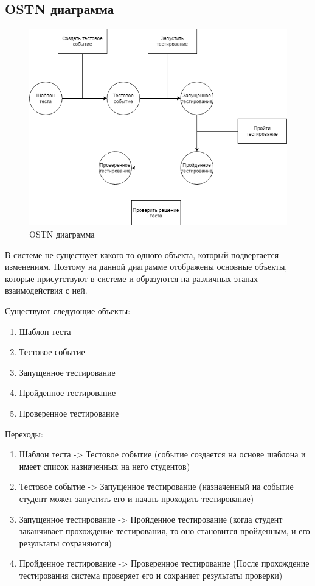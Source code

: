 \subsection{OSTN диаграмма}
\begin{figure}[H]
    \includegraphics[width=\textwidth, center]{../img/OSTN.png}
    \caption{OSTN диаграмма}
\end{figure}

В системе не существует какого-то одного объекта, который подвергается изменениям.
Поэтому на данной диаграмме отображены основные объекты, которые присутствуют в
системе и образуются на различных этапах взаимодействия с ней.

Существуют следующие объекты:
\begin{enumerate}
    \item Шаблон теста
    \item Тестовое событие
    \item Запущенное тестирование
    \item Пройденное тестирование
    \item Проверенное тестирование
\end{enumerate}

Переходы:
\begin{enumerate}
    \item Шаблон теста -> Тестовое событие (событие создается на основе шаблона
    и имеет список назначенных на него студентов)
    \item Тестовое событие -> Запущенное тестирование (назначенный на событие студент
    может запустить его и начать проходить тестирование)
    \item Запущенное тестирование -> Пройденное тестирование (когда студент заканчивает
    прохождение тестирования, то оно становится пройденным, и его результаты сохраняются)
    \item Пройденное тестирование -> Проверенное тестирование (После прохождение тестирования
    система проверяет его и сохраняет результаты проверки)
\end{enumerate}


